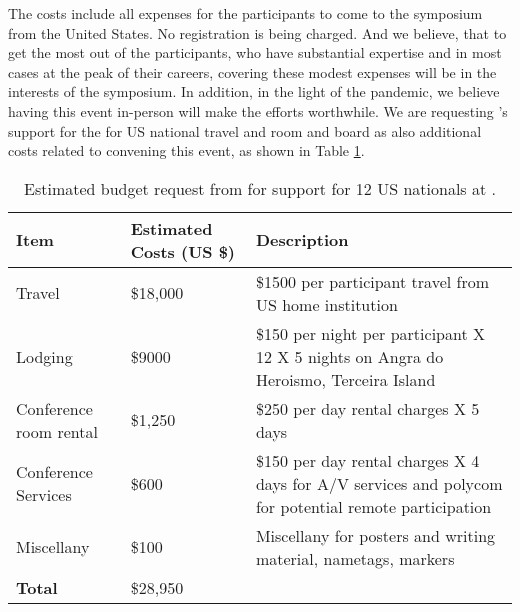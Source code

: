 
The costs include all expenses for the participants to come to the
symposium from the United States. No registration is being
charged. And we believe, that to get the most out of the participants,
who have substantial expertise and in most cases at the peak of their
careers, covering these modest expenses will be in the interests of
the symposium. In addition, in the light of the pandemic, we believe
having this event in-person will make the efforts worthwhile.  We are
requesting \nsfe's support for the \symp for US national travel and
room and board as also additional costs related to convening this
event, as shown in Table \ref{tab:nsf-budget}.

\begin{table}[!h]
  \footnotesize{
    \centering    
    \begin{tabular}{|p{3.0cm}|p{1.6cm}|p{10cm}|}
      \hline 
      \rowcolor{Gray}
      \bfseries Item& \bfseries Estimated Costs (US \$)&\bfseries Description\\
      \hline
      Travel & \$18,000 & \$1500 per participant travel from US home institution \\
      \hline
      Lodging& \$9000 & \$150 per night per participant X 12 X 5 nights on Angra do Heroismo, Terceira Island\\
      \hline
      Conference room rental &\$1,250 & \$250 per day rental charges X
                                        5 days\\
      \hline
      Conference Services& \$600 &  \$150 per day rental charges X 4
                                   days for A/V services and
                                   polycom for potential remote
                                   participation\\
      \hline
      Miscellany& \$100 & Miscellany for posters and writing material,
                          nametags, markers\\
      \hline
      \textbf{Total}& \$28,950&\\
      \hline        
  \end{tabular}
  \caption{Estimated budget request from \nsf for support for 12 US
    nationals at \sympe.}
  \label{tab:nsf-budget}
}
\end{table}

